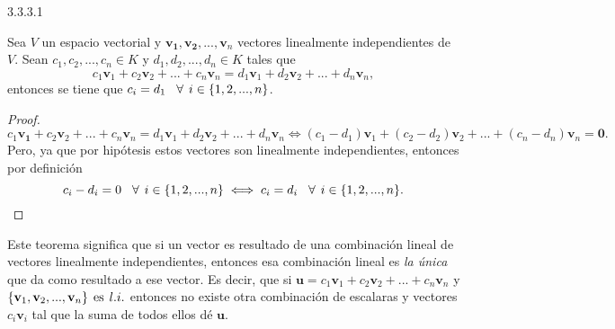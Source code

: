 \documentclass[apuntes]{subfiles}
\begin{document}
\begin{teo} {3.3.3.1} 

    Sea $V$ un espacio vectorial y $\mathbf{v_1}, \mathbf{v_2}, ..., \mathbf{v}_n$ vectores linealmente independientes de $V$. Sean $c_1, c_2, ..., c_n\in K$ y $d_1, d_2, ..., d_n\in K$ tales que $$c_1\mathbf{v}_1+c_2\mathbf{v}_2+...+c_n\mathbf{v}_n=d_1\mathbf{v}_1+d_2\mathbf{v}_2+...+d_n\mathbf{v}_n,$$ entonces se tiene que $c_i=d_1\hspace{3mm}\forall\hspace{1.5mm}i\in\{1,2, ..., n\}$.

    \begin{proof}

        $$c_1\mathbf{v_1}+c_2\mathbf{v}_2+...+c_n\mathbf{v}_n=d_1\mathbf{v}_1+d_2\mathbf{v}_2+...+d_n\mathbf{v}_n\iff(c_1-d_1)\mathbf{v}_1+(c_2-d_2)\mathbf{v}_2+...+(c_n-d_n)\mathbf{v}_n=\mathbf{0}.$$ Pero, ya que por hipótesis estos vectores son linealmente independientes, entonces por definición $$c_i-d_i=0\hspace{3mm}\forall\hspace{1.5mm}i\in\{1,2, ...,n\}\iff c_i=d_i\hspace{3mm}\forall\hspace{1.5mm}i\in\{1,2, ...,n\}.$$

    \end{proof}

    Este teorema significa que si un vector es resultado de una combinación lineal de vectores linealmente independientes, entonces esa combinación lineal es \emph{la única} que da como resultado a ese vector. Es decir, que si $\mathbf{u}=c_1\mathbf{v}_1+c_2\mathbf{v}_2+...+c_n\mathbf{v}_n$ y $\{\mathbf{v}_1,\mathbf{v}_2, ...,\mathbf{v}_n\}\hspace{1.5mm}\text{es}\hspace{1.5mm} l.i.$ entonces no existe otra combinación de escalaras y vectores $c_i \mathbf{v}_i$ tal que la suma de todos ellos dé $\mathbf{u}$.

\end{teo}
\end{document}
